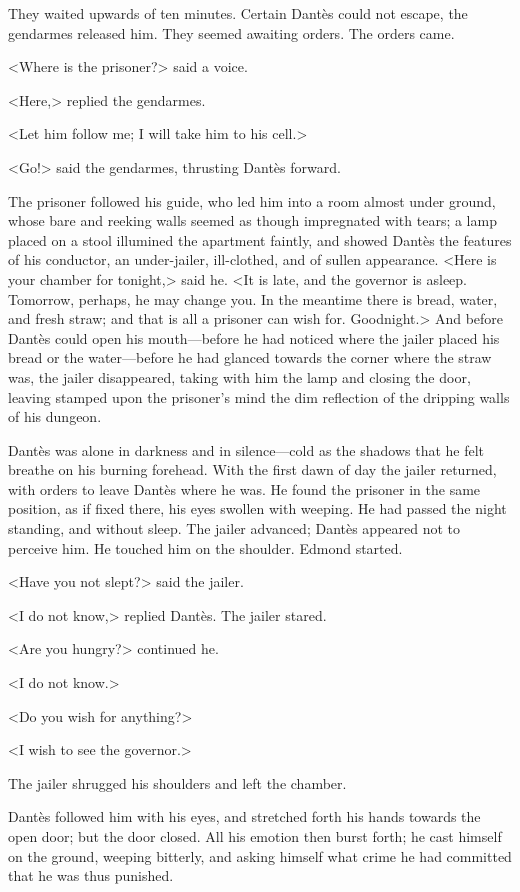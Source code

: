  They waited upwards of ten minutes. Certain Dantès could not escape, the gendarmes released him. They seemed awaiting orders. The orders came. 

 <Where is the prisoner?> said a voice. 

 <Here,> replied the gendarmes. 

 <Let him follow me; I will take him to his cell.> 

 <Go!> said the gendarmes, thrusting Dantès forward. 

 The prisoner followed his guide, who led him into a room almost under ground, whose bare and reeking walls seemed as though impregnated with tears; a lamp placed on a stool illumined the apartment faintly, and showed Dantès the features of his conductor, an under-jailer, ill-clothed, and of sullen appearance.  <Here is your chamber for tonight,> said he. <It is late, and the governor is asleep. Tomorrow, perhaps, he may change you. In the meantime there is bread, water, and fresh straw; and that is all a prisoner can wish for. Goodnight.> And before Dantès could open his mouth—before he had noticed where the jailer placed his bread or the water—before he had glanced towards the corner where the straw was, the jailer disappeared, taking with him the lamp and closing the door, leaving stamped upon the prisoner's mind the dim reflection of the dripping walls of his dungeon. 

 Dantès was alone in darkness and in silence—cold as the shadows that he felt breathe on his burning forehead. With the first dawn of day the jailer returned, with orders to leave Dantès where he was. He found the prisoner in the same position, as if fixed there, his eyes swollen with weeping. He had passed the night standing, and without sleep. The jailer advanced; Dantès appeared not to perceive him. He touched him on the shoulder. Edmond started. 

 <Have you not slept?> said the jailer. 

 <I do not know,> replied Dantès. The jailer stared. 

 <Are you hungry?> continued he. 

 <I do not know.> 

 <Do you wish for anything?> 

 <I wish to see the governor.> 

 The jailer shrugged his shoulders and left the chamber. 

 Dantès followed him with his eyes, and stretched forth his hands towards the open door; but the door closed. All his emotion then burst forth; he cast himself on the ground, weeping bitterly, and asking himself what crime he had committed that he was thus punished. 

